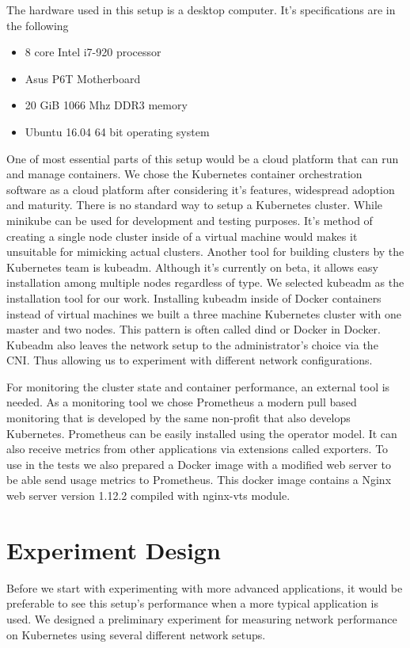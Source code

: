 \documentclass[12pt,oneandhalf,chaparabic,ceng,ms,eng,oneside,pntc]{gsufbe}
\begin{document}
The hardware used in this setup is a desktop computer. It's specifications are in the following
\begin{itemize}
 \item 8 core Intel i7-920 processor
 \item Asus P6T Motherboard
 \item 20 GiB 1066 Mhz DDR3 memory
 \item Ubuntu 16.04 64 bit operating system
\end{itemize}

One of most essential parts of this setup would be a cloud platform that can run and manage containers.
We chose the Kubernetes container orchestration software as a cloud platform after considering it's
features, widespread adoption and maturity. There is no standard way to setup a Kubernetes cluster.
While minikube can be used for development and testing purposes. It's method of creating a single node
cluster inside of a virtual machine would makes it unsuitable for mimicking actual clusters. Another
tool for building clusters by the Kubernetes team is kubeadm. Although it's currently on beta, it
allows easy installation among multiple nodes regardless of type. We selected kubeadm as the 
installation tool for our work. Installing kubeadm inside of Docker containers instead of virtual
machines we built a three machine Kubernetes cluster with one master and two nodes. This pattern is
often called dind or Docker in Docker. Kubeadm also leaves the network setup to the administrator's
choice via the CNI. Thus allowing us to experiment with different network configurations.

For monitoring the cluster state and container performance, an external tool is needed. As a monitoring
tool we chose Prometheus a modern pull based monitoring that is developed by the same non-profit that
also develops Kubernetes. Prometheus can be easily installed using the operator model. It can also
receive metrics from other applications via extensions called exporters. To use in the tests we also 
prepared a Docker image with a modified web server to be able send usage metrics to Prometheus. This
docker image contains a Nginx web server version 1.12.2 compiled with nginx-vts module.

\section{Experiment Design}
Before we start with experimenting with more advanced applications, it would be preferable to see this
setup's performance when a more typical application is used. We designed a preliminary experiment for
measuring network performance on Kubernetes using several different network setups.
\end{document}

